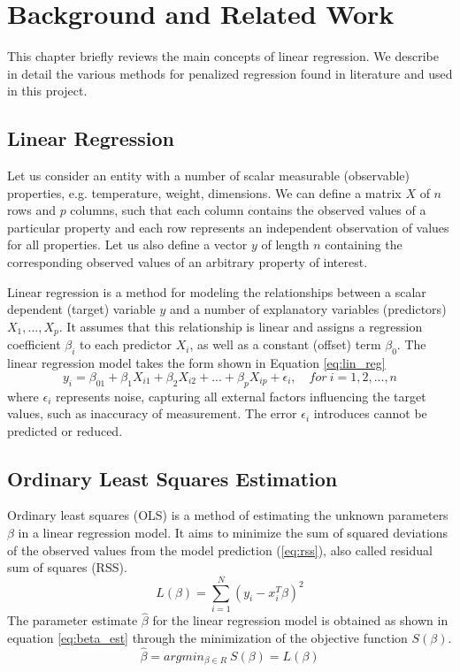 \chapter{Background and Related Work} \label{background}
This chapter briefly reviews the main concepts of linear regression. We describe in detail the various methods for penalized regression found in literature and used in this project.


\section{Linear Regression}
Let us consider an entity with a number of scalar measurable (observable) properties, e.g. temperature, weight, dimensions. We can define a matrix $X$ of $n$ rows and $p$ columns, such that each column contains the observed values of a particular property and each row represents an independent observation of values for all properties. Let us also define a vector $y$ of length $n$ containing the corresponding observed values of an arbitrary property of interest.

Linear regression is a method for modeling the relationships between a scalar dependent (target) variable $y$ and a number of explanatory variables (predictors) $X_1,...,X_p$. It assumes that this relationship is linear and assigns a regression coefficient $\beta_i$ to each predictor $X_i$, as well as a constant (offset) term $\beta_0$. The linear regression model takes the form shown in Equation \ref{eq:lin_reg}
\begin{equation} \label{eq:lin_reg}
y_i = \beta_01+\beta_1X_{i1}+\beta_2X_{i2}+...+\beta_pX_{ip}+\epsilon_i, \quad for\ i=1,2,...,n
\end{equation}
where $\epsilon_i$ represents noise, capturing all external factors influencing the target values, such as inaccuracy of measurement. The error $\epsilon_i$ introduces cannot be predicted or reduced.


\section{Ordinary Least Squares Estimation} \label{sec:olse}
Ordinary least squares (OLS) is a method of estimating the unknown parameters $\beta$ in a linear regression model. It aims to minimize the sum of squared deviations of the observed values from the model prediction (\ref{eq:rss}), also called residual sum of squares (RSS).
\begin{equation} \label{eq:rss}
L(\beta) = \sum_{i=1}^{N} (y_i - x_i^T\beta)^2
\end{equation}
The parameter estimate $\hat{\beta}$ for the linear regression model is obtained as shown in equation \ref{eq:beta_est} through the minimization of the objective function $S(\beta)$.
\begin{equation} \label{eq:beta_est}
\hat{\beta} = argmin_{\beta \in R}\ S(\beta) = L(\beta)
\end{equation}


